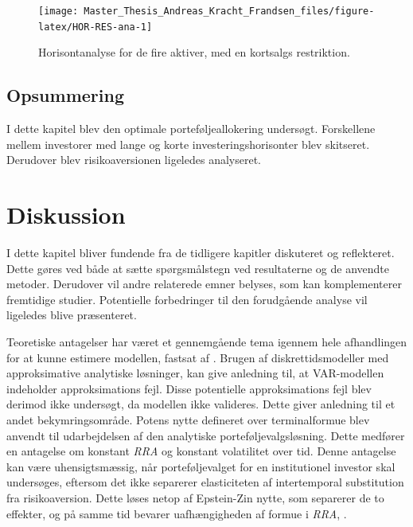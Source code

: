 \documentclass[
  a4paper,
  oneside]{memoir}
\begin{document}
\begin{figure}[H]

{\centering \texttt{[image: Master\_Thesis\_Andreas\_Kracht\_Frandsen\_files/figure-latex/HOR-RES-ana-1]} 

}

\caption{Horisontanalyse for de fire aktiver, med en kortsalgs restriktion.}\label{fig:HOR-RES-ana}
\end{figure}

\hypertarget{opsummering-4}{%
\section{Opsummering}\label{opsummering-4}}

I dette kapitel blev den optimale porteføljeallokering undersøgt. Forskellene mellem investorer med lange og korte investeringshorisonter blev skitseret. Derudover blev risikoaversionen ligeledes analyseret.

\hypertarget{diskussion}{%
\chapter{Diskussion}\label{diskussion}}

I dette kapitel bliver fundende fra de tidligere kapitler diskuteret og reflekteret. Dette gøres ved både at sætte spørgsmålstegn ved resultaterne og de anvendte metoder. Derudover vil andre relaterede emner belyses, som kan komplementerer fremtidige studier. Potentielle forbedringer til den forudgående analyse vil ligeledes blive præsenteret.

Teoretiske antagelser har været et gennemgående tema igennem hele afhandlingen for at kunne estimere modellen, fastsat af \citep{JurVic2011}. Brugen af diskrettidsmodeller med approksimative analytiske løsninger, kan give anledning til, at VAR-modellen indeholder approksimations fejl. Disse potentielle approksimations fejl blev derimod ikke undersøgt, da modellen ikke valideres. Dette giver anledning til et andet bekymringsområde. Potens nytte defineret over terminalformue blev anvendt til udarbejdelsen af den analytiske porteføljevalgsløsning. Dette medfører en antagelse om konstant \emph{RRA} og konstant volatilitet over tid. Denne antagelse kan være uhensigtsmæssig, når porteføljevalget for en institutionel investor skal undersøges, eftersom det ikke separerer elasticiteten af intertemporal substitution fra risikoaversion. Dette løses netop af Epstein-Zin nytte, som separerer de to effekter, og på samme tid bevarer uafhængigheden af formue i \emph{RRA}, \citep{CampVicCha2003}.
\end{document}
